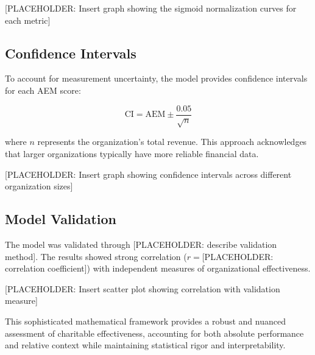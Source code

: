 [PLACEHOLDER: Insert graph showing the sigmoid normalization curves for each metric]

\subsection{Confidence Intervals}

To account for measurement uncertainty, the model provides confidence intervals for each AEM score:

\begin{equation}
    \text{CI} = \text{AEM} \pm \frac{0.05}{\sqrt{n}}
\end{equation}

where $n$ represents the organization's total revenue. This approach acknowledges that larger organizations typically have more reliable financial data.

[PLACEHOLDER: Insert graph showing confidence intervals across different organization sizes]

\subsection{Model Validation}

The model was validated through [PLACEHOLDER: describe validation method]. The results showed strong correlation ($r = $[PLACEHOLDER: correlation coefficient]) with independent measures of organizational effectiveness.

[PLACEHOLDER: Insert scatter plot showing correlation with validation measure]

This sophisticated mathematical framework provides a robust and nuanced assessment of charitable effectiveness, accounting for both absolute performance and relative context while maintaining statistical rigor and interpretability.
